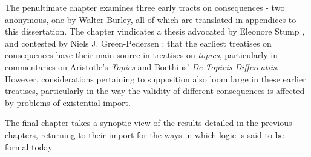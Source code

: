 \documentclass[]{article}
\begin{document}
The penultimate chapter examines three early tracts on consequences - two anonymous, one by Walter Burley, all of which are translated in appendices to this dissertation. The chapter vindicates a thesis advocated by Eleonore Stump \cite{Stump1989}, and contested by Niels J. Green-Pedersen \cite{Green-Pedersen1984}: that the earliest treatises on consequences have their main source in treatises on \textit{topics}, particularly in commentaries on Aristotle's \textit{Topics} and Boethius' \textit{De Topicis Differentiis}. However, considerations pertaining to supposition also loom large in these earlier treatises, particularly in the way the validity of different consequences is affected by problems of existential import.

The final chapter takes a synoptic view of the results detailed in the previous chapters, returning to their import for the ways in which logic is said to be formal today.


\end{document}
